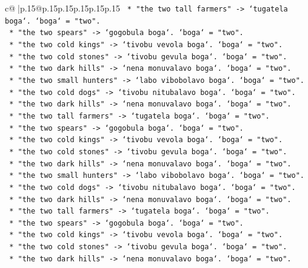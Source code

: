 \documentclass{article}
\begin{document}
{\begin{supertabular}{c@{$\;$}|p{.15\linewidth}@{}p{.15\linewidth}p{.15\linewidth}p{.15\linewidth}p{.15\linewidth}p{.15\linewidth}}
{{{\texttt{        *   "the two tall farmers" {-}> `tugatela boga`. `boga` = "two".} \\
\texttt{        *   "the two spears" {-}> `gogobula boga`. `boga` = "two".} \\
\texttt{        *   "the two cold kings" {-}> `tivobu vevola boga`. `boga` = "two".} \\
\texttt{        *   "the two cold stones" {-}> `tivobu gevula boga`. `boga` = "two".} \\
\texttt{        *   "the two dark hills" {-}> `nena monuvalavo boga`. `boga` = "two".} \\
\texttt{        *   "the two small hunters" {-}> `labo vibobolavo boga`. `boga` = "two".} \\
\texttt{        *   "the two cold dogs" {-}> `tivobu nitubalavo boga`. `boga` = "two".} \\
\texttt{        *   "the two dark hills" {-}> `nena monuvalavo boga`. `boga` = "two".} \\
\texttt{        *   "the two tall farmers" {-}> `tugatela boga`. `boga` = "two".} \\
\texttt{        *   "the two spears" {-}> `gogobula boga`. `boga` = "two".} \\
\texttt{        *   "the two cold kings" {-}> `tivobu vevola boga`. `boga` = "two".} \\
\texttt{        *   "the two cold stones" {-}> `tivobu gevula boga`. `boga` = "two".} \\
\texttt{        *   "the two dark hills" {-}> `nena monuvalavo boga`. `boga` = "two".} \\
\texttt{        *   "the two small hunters" {-}> `labo vibobolavo boga`. `boga` = "two".} \\
\texttt{        *   "the two cold dogs" {-}> `tivobu nitubalavo boga`. `boga` = "two".} \\
\texttt{        *   "the two dark hills" {-}> `nena monuvalavo boga`. `boga` = "two".} \\
\texttt{        *   "the two tall farmers" {-}> `tugatela boga`. `boga` = "two".} \\
\texttt{        *   "the two spears" {-}> `gogobula boga`. `boga` = "two".} \\
\texttt{        *   "the two cold kings" {-}> `tivobu vevola boga`. `boga` = "two".} \\
\texttt{        *   "the two cold stones" {-}> `tivobu gevula boga`. `boga` = "two".} \\
\texttt{        *   "the two dark hills" {-}> `nena monuvalavo boga`. `boga` = "two".} \\
}}}
\end{supertabular}}
\end{document}
